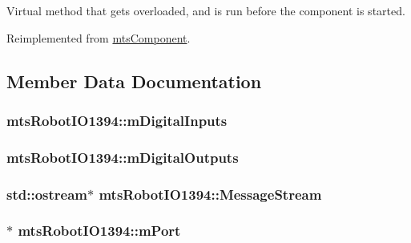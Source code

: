 Virtual method that gets overloaded, and is run before the component is started. 

Reimplemented from \hyperlink{classmts_component_aaf28f0262b44eb6866e10089a02fa6e4}{mts\-Component}.



\subsection{Member Data Documentation}
\hypertarget{classmts_robot_i_o1394_ae9b99471cc8a0b6c9b45cb987c1ac37c}{
\subsubsection[{m\-Digital\-Inputs}]{ mts\-Robot\-I\-O1394\-::m\-Digital\-Inputs\hspace{0.3cm}{\ttfamily [protected]}}}\label{classmts_robot_i_o1394_ae9b99471cc8a0b6c9b45cb987c1ac37c}
\hypertarget{classmts_robot_i_o1394_a23e225b6c79ab0c40909c93b1985d8e7}{
\subsubsection[{m\-Digital\-Outputs}]{ mts\-Robot\-I\-O1394\-::m\-Digital\-Outputs\hspace{0.3cm}{\ttfamily [protected]}}}\label{classmts_robot_i_o1394_a23e225b6c79ab0c40909c93b1985d8e7}
\hypertarget{classmts_robot_i_o1394_a8d67ddd80442e47e158141ab5bcfdf1a}{
\subsubsection[{Message\-Stream}]{\setlength{\rightskip}{0pt plus 5cm}std\-::ostream$\ast$ mts\-Robot\-I\-O1394\-::\-Message\-Stream\hspace{0.3cm}{\ttfamily [protected]}}}\label{classmts_robot_i_o1394_a8d67ddd80442e47e158141ab5bcfdf1a}
\hypertarget{classmts_robot_i_o1394_a9bb22957cd6623ad743e6abf60ea187e}{
\subsubsection[{m\-Port}]{$\ast$ mts\-Robot\-I\-O1394\-::m\-Port\hspace{0.3cm}{\ttfamily [protected]}}}\label{classmts_robot_i_o1394_a9bb22957cd6623ad743e6abf60ea187e}
